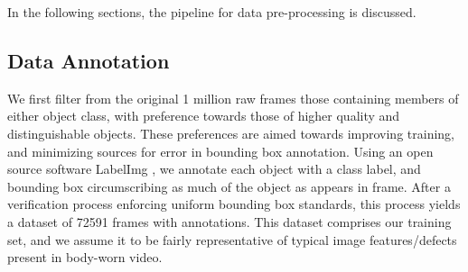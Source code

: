 \documentclass[a4paper]{article}
\begin{document}
In the following sections, the pipeline for data pre-processing is discussed. 

\subsection{Data Annotation}
We first filter from the original 1 million raw frames those containing members of either object class, with preference towards those of higher quality and distinguishable objects. These preferences are aimed towards improving training, and minimizing sources for error in bounding box annotation. Using an open source software LabelImg \cite{github1}, we annotate each object with a class label, and bounding box circumscribing as much of the object as appears in frame. After a verification process enforcing uniform bounding box standards, this process yields a dataset of 72591 frames with annotations. This dataset comprises our training set, and we assume it to be fairly representative of typical image features/defects present in body-worn video.
\end{document}
